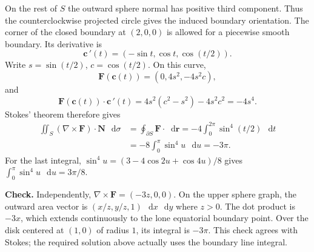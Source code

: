 \documentclass[11pt,letterpaper]{article}
\newcommand{\curl}{\nabla\times}
\renewcommand{\vec}[1]{\mathbf{#1}}
\newcommand{\dd}{\mathop{}\!\mathrm{d}}
\newcommand{\verification}[1]{\par\textbf{Check.} #1\par}
\begin{document}
On the rest of $S$ the outward sphere normal has positive third component.
Thus the counterclockwise projected circle gives the induced boundary
orientation. The corner of the closed boundary at $(2,0,0)$ is allowed
for a piecewise smooth boundary. Its derivative is
\[
\vec c\,'(t)=(-\sin t,\cos t,\cos(t/2)).
\]
Write $s=\sin(t/2)$, $c=\cos(t/2)$. On this curve,
\[
\vec F(\vec c(t))=(0,4s^2,-4s^2c),
\]
and
\[
\vec F(\vec c(t))\cdot\vec c\,'(t)
=4s^2(c^2-s^2)-4s^2c^2=-4s^4.
\]
Stokes' theorem therefore gives
\[
\begin{aligned}
\iint_S(\curl\vec F)\cdot\vec N\,\dd\sigma
&=\oint_{\partial S}\vec F\cdot\dd\vec r
=-4\int_0^{2\pi}\sin^4(t/2)\,\dd t\\
&=-8\int_0^\pi\sin^4u\,\dd u
=\boxed{-3\pi}.
\end{aligned}
\]
For the last integral, $\sin^4u=(3-4\cos2u+\cos4u)/8$ gives
$\int_0^\pi\sin^4u\,\dd u=3\pi/8$.
\verification{Independently, $\curl\vec F=(-3z,0,0)$. On the upper
sphere graph, the outward area vector is $(x/z,y/z,1)\,\dd x\,\dd y$
where $z>0$. The dot product is $-3x$, which extends continuously to
the lone equatorial boundary point. Over the disk centered at $(1,0)$
of radius $1$, its integral is $-3\pi$. This check agrees with Stokes;
the required solution above actually uses the boundary line integral.}
\end{document}
